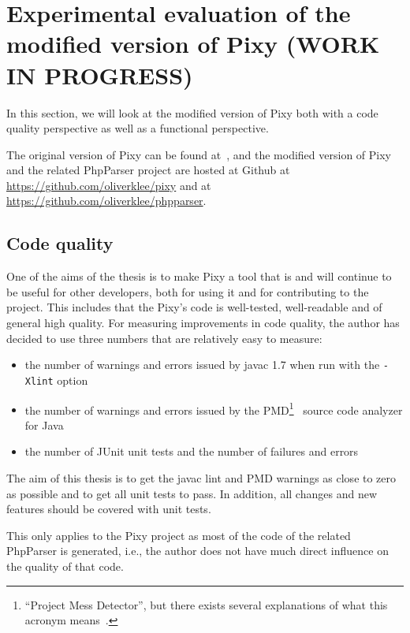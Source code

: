 \chapter{Experimental evaluation of the modified version of Pixy (WORK IN PROGRESS)}

In this section, we will look at the modified version of Pixy both with a code quality perspective as well as a functional perspective.

The original version of Pixy can be found at~\cite{pixy}, and the modified version of Pixy and the related PhpParser project are hosted at Github at \url{https://github.com/oliverklee/pixy} and at \url{https://github.com/oliverklee/phpparser}.

\section{Code quality}
\label{code-quality}
One of the aims of the thesis is to make Pixy a tool that is and will continue to be useful for other developers, both for using it and for contributing to the project. This includes that the Pixy's code is well-tested, well-readable and of general high quality. For measuring improvements in code quality, the author has decided to use three numbers that are relatively easy to measure:

\begin{itemize}
  \item the number of warnings and errors issued by javac 1.7 when run with the \texttt{-Xlint} option
  \item the number of warnings and errors issued by the PMD\footnote{``Project Mess Detector'', but there exists several explanations of what this acronym means~\cite{pmd-meaning}.}~\cite{pmd} source code analyzer for Java
  \item the number of JUnit unit tests and the number of failures and errors
\end{itemize}

The aim of this thesis is to get the javac lint and PMD warnings as close to zero as possible and to get all unit tests to pass. In addition, all changes and new features should be covered with unit tests.

This only applies to the Pixy project as most of the code of the related PhpParser is generated, i.e., the author does not have much direct influence on the quality of that code.

